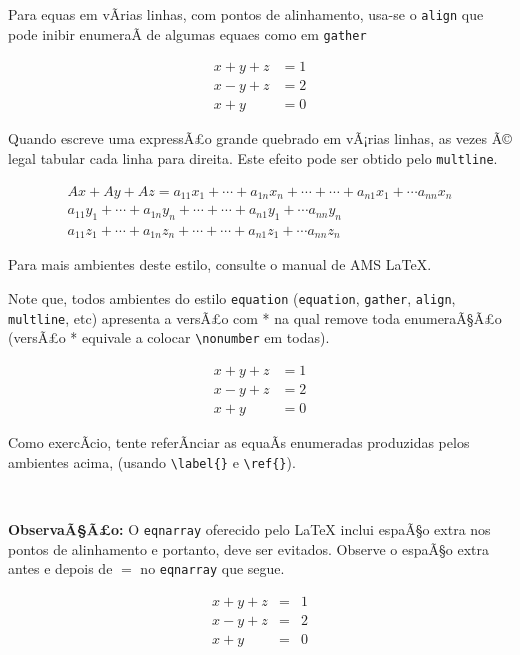 \documentclass[12pt,a4paper]{article}
\begin{document}
Para equas em vÃrias linhas, com pontos de alinhamento, 
usa-se o \texttt{align} que pode inibir enumeraÃ 
de algumas equaes como em \texttt{gather}

\begin{align}
x+y+z&=1 \\
x-y+z&=2 \nonumber \\
x+y&=0
\end{align}

Quando escreve uma expressÃ£o grande quebrado em vÃ¡rias linhas,
as vezes Ã© legal tabular cada linha para direita.
Este efeito pode ser obtido pelo \verb|multline|.

\begin{multline}
Ax+Ay+Az=
  a_{11}x_1+\cdots +a_{1n}x_n+\cdots +\cdots +a_{n1}x_1+\cdots a_{nn}x_n    \\
  a_{11}y_1+\cdots +a_{1n}y_n+\cdots +\cdots +a_{n1}y_1+\cdots a_{nn}y_n    \\
  a_{11}z_1+\cdots +a_{1n}z_n+\cdots +\cdots +a_{n1}z_1+\cdots a_{nn}z_n    
\end{multline}


Para mais ambientes deste estilo, consulte o manual de AMS \LaTeX.

Note que, todos ambientes do estilo \texttt{equation} 
(\texttt{equation}, \texttt{gather}, \texttt{align}, \texttt{multline}, etc)
apresenta a versÃ£o com * na qual remove toda enumeraÃ§Ã£o (versÃ£o * equivale 
a colocar \verb|\nonumber| em todas).

\begin{align*}
x+y+z&=1 \\
x-y+z&=2 \\
x+y&=0
\end{align*}

Como exercÃ­cio, tente referÃnciar as equaÃs enumeradas produzidas pelos ambientes acima,
(usando \verb|\label{}| e \verb|\ref{}|).

\

\textbf{ObservaÃ§Ã£o:} O \texttt{eqnarray} oferecido pelo \LaTeX{} inclui 
espaÃ§o extra nos pontos de alinhamento e portanto, 
deve ser evitados.
Observe o espaÃ§o extra antes e depois de $=$ no \texttt{eqnarray} que segue.

\begin{eqnarray*}
x+y+z&=&1 \\
x-y+z&=&2 \\
x+y&=&0
\end{eqnarray*}
\end{document}
